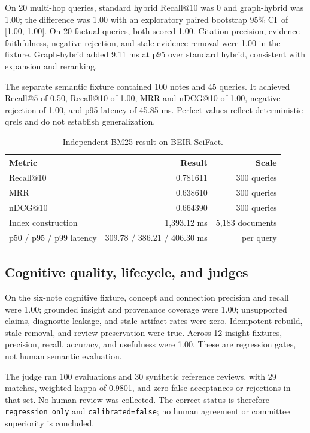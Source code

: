 \documentclass{sbc2023}
\newcommand{\CI}{95\% CI}
\newcommand{\code}[1]{\texttt{#1}}
\begin{document}
On 20 multi-hop queries, standard hybrid Recall@10 was 0 and graph-hybrid was 1.00; the
difference was 1.00 with an exploratory paired bootstrap \CI\ of [1.00, 1.00]. On 20 factual
queries, both scored 1.00. Citation precision, evidence faithfulness, negative rejection, and stale
evidence removal were 1.00 in the fixture. Graph-hybrid added 9.11 ms at p95 over standard hybrid,
consistent with expansion and reranking.

The separate semantic fixture contained 100 notes and 45 queries. It achieved Recall@5 of 0.50,
Recall@10 of 1.00, MRR and nDCG@10 of 1.00, negative rejection of 1.00, and p95 latency of
45.85 ms. Perfect values reflect deterministic qrels and do not establish generalization.

\begin{table}[!htbp]
\caption{Independent BM25 result on BEIR SciFact.}
\label{tab:beir}
\centering
\small
\begin{tabularx}{\columnwidth}{Yrr}
\toprule
Metric & Result & Scale \\
\midrule
Recall@10 & 0.781611 & 300 queries \\
MRR & 0.638610 & 300 queries \\
nDCG@10 & 0.664390 & 300 queries \\
Index construction & 1,393.12 ms & 5,183 documents \\
p50 / p95 / p99 latency & 309.78 / 386.21 / 406.30 ms & per query \\
\bottomrule
\end{tabularx}
\end{table}

\subsection{Cognitive quality, lifecycle, and judges}

On the six-note cognitive fixture, concept and connection precision and recall were 1.00; grounded
insight and provenance coverage were 1.00; unsupported claims, diagnostic leakage, and stale
artifact rates were zero. Idempotent rebuild, stale removal, and review preservation were true.
Across 12 insight fixtures, precision, recall, accuracy, and usefulness were 1.00. These are
regression gates, not human semantic evaluation.

The judge ran 100 evaluations and 30 synthetic reference reviews, with 29 matches, weighted kappa
of 0.9801, and zero false acceptances or rejections in that set. No human review was collected.
The correct status is therefore \code{regression\_only} and \code{calibrated=false}; no human
agreement or committee superiority is concluded.
\end{document}
